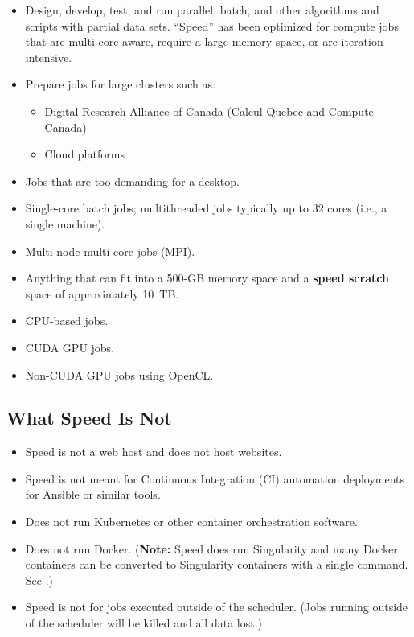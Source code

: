 \begin{itemize}
	\item
	Design, develop, test, and run parallel, batch, and other algorithms and scripts with partial data sets.
	``Speed'' has been optimized for compute jobs that are multi-core aware,
	require a large memory space, or are iteration intensive.

	\item
	Prepare jobs for large clusters such as:
		\begin{itemize}
			\item Digital Research Alliance of Canada (Calcul Quebec and Compute Canada)
			\item Cloud platforms
		\end{itemize}
	\item
	Jobs that are too demanding for a desktop.
	\item
	Single-core batch jobs; multithreaded jobs typically up to 32 cores (i.e., a single machine).
	\item
	Multi-node multi-core jobs (MPI).
	\item
	Anything that can fit into a 500-GB memory space and a \textbf{speed scratch} space of approximately 10~TB. 
	\item
	CPU-based jobs.
	\item
	CUDA GPU jobs.
	\item
	Non-CUDA GPU jobs using OpenCL.
\end{itemize}

\subsection{What Speed Is Not}
\label{sect:speed-is-not}

\begin{itemize}
	\item Speed is not a web host and does not host websites.
	\item Speed is not meant for Continuous Integration (CI) automation deployments for Ansible or similar tools.
	\item Does not run Kubernetes or other container orchestration software.
	\item Does not run Docker. (\textbf{Note:} Speed does run Singularity and many Docker containers can be converted to
	Singularity containers with a single command. See .)
	\item Speed is not for jobs executed outside of the scheduler. (Jobs running outside of the scheduler will be killed and all data lost.)
\end{itemize}

